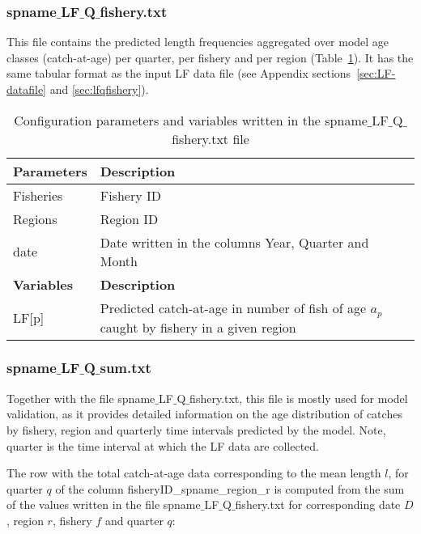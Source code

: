 \subsubsection{{\ttfamily spname$\_$LF$\_$Q$\_$fishery.txt}}
\label{file:LFQfishery}
This file contains the predicted length frequencies aggregated over model age classes (catch-at-age) per quarter, per fishery and per region (Table~\ref{tab:LFQfishery}). It has the same tabular format as the input LF data file (see Appendix sections~\ref{sec:LF-datafile} and \ref{sec:lfqfishery}). \\

\begin{center}
\begin{table}[H]
\caption{Configuration parameters and variables written in the {\ttfamily spname$\_$LF$\_$Q$\_$fishery.txt} file}
\raggedleft
\begin{tabular}{p{3cm}p{12.5cm}}
    \hline
    {\bfseries Parameters} & {\bfseries Description}\\ \hline\hline 
    {\ttfamily Fisheries} & Fishery ID \\\hline
    {\ttfamily Regions} & Region ID \\\hline
    {\ttfamily date} & Date written in the columns Year, Quarter and Month \\\hline
    {\bfseries Variables} & {\bfseries Description}\\ \hline\hline 
    {\ttfamily LF[p]}  & Predicted catch-at-age in number of fish of age $a_p$ caught by fishery in a given region\\
    \hline
\end{tabular}
\label{tab:LFQfishery}
\end{table}
\end{center}


\subsubsection{{\ttfamily spname$\_$LF$\_$Q$\_$sum.txt}}
\label{file:sumLFQfishery}
Together with the file {\ttfamily spname$\_$LF$\_$Q$\_$fishery.txt}, this file is mostly used for model validation, as it provides detailed information on the age distribution of catches by fishery, region and quarterly time intervals predicted by the model. Note, quarter is the time interval at which the LF data are collected. 

The row with the total catch-at-age data corresponding to the mean length $l$, for quarter $q$ of the column {\ttfamily fisheryID\_spname\_region\_r} is computed from the sum of the values written in the file {\ttfamily spname$\_$LF$\_$Q$\_$fishery.txt} for corresponding  date $D$, region $r$, fishery $f$ and quarter $q$:

